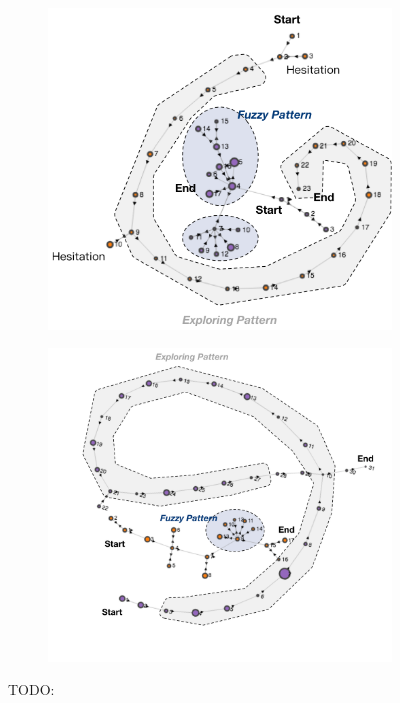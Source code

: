 \begin{figure}[H]
    \centering
    \begin{subfigure}[b]{0.60\textwidth}
        \includegraphics[width=1\textwidth]{figures/vis-fuzzy-explore1}
        \caption{}
        \label{fig:vis-fuzzy-explore1}
    \end{subfigure}
    \begin{subfigure}[b]{0.60\textwidth}
        \includegraphics[width=1\textwidth]{figures/vis-fuzzy-explore2}
        \caption{}
        \label{fig:vis-fuzzy-explore2}
    \end{subfigure}
    \caption{TODO:}
    \label{fig:vis-fuzzy-explore}
\end{figure}

